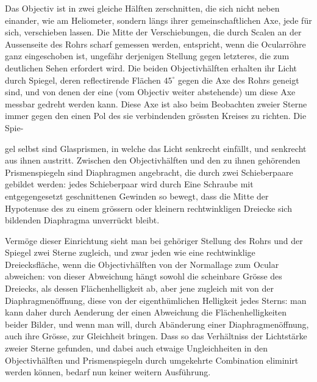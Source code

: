 Das Objectiv ist in zwei gleiche Hälften zerschnitten, die sich nicht neben einander, wie am Heliometer, sondern längs ihrer gemeinschaftlichen Axe, jede für sich, verschieben lassen. Die Mitte der Verschiebungen, die durch Scalen an der Aussenseite des Rohrs scharf gemessen werden, entspricht, wenn die Ocularröhre ganz eingeschoben ist, ungefähr derjenigen Stellung gegen letzteres, die zum deutlichen Sehen erfordert wird. Die beiden Objectivhälften erhalten ihr Licht durch Spiegel, deren reflectirende Flächen $45^\circ$ gegen die Axe des Rohrs geneigt sind, und von denen der eine (vom Objectiv weiter abstehende) um diese Axe messbar gedreht werden kann. Diese Axe ist also beim Beobachten zweier Sterne immer gegen den einen Pol des sie verbindenden grössten Kreises zu richten. Die Spie-\par
\clearpage
\thispagestyle{empty}
\noindent{}%
\makebox[12mm][l]{}%
%
\par\medskip
\noindent gel selbst sind Glasprismen, in welche das Licht senkrecht einfällt, und senkrecht aus ihnen
austritt. Zwischen den Objectivhälften und den zu ihnen gehörenden Prismenspiegeln sind
Diaphragmen angebracht, die durch zwei Schieberpaare gebildet werden: jedes Schieberpaar wird
durch Eine Schraube mit entgegengesetzt geschnittenen Gewinden so bewegt, dass die Mitte der
Hypotenuse des zu einem grössern oder kleinern rechtwinkligen Dreiecke sich bildenden Diaphragma
unverrückt bleibt.

Vermöge dieser Einrichtung sieht man bei gehöriger Stellung des Rohrs und der Spiegel zwei Sterne
zugleich, und zwar jeden wie eine rechtwinklige Dreiecksfläche, wenn die Objectivhälften von der
Normallage zum Ocular abweichen: von dieser Abweichung hängt sowohl die scheinbare Grösse des
Dreiecks, als dessen Flächenhelligkeit ab, aber jene zugleich mit von der Diaphragmenöffnung, diese
von der eigenthümlichen Helligkeit jedes Sterns: man kann daher durch Aenderung der einen
Abweichung die Flächenhelligkeiten beider Bilder, und wenn man will, durch Abänderung einer
Diaphragmenöffnung, auch ihre Grösse, zur Gleichheit bringen. Dass so das Verhältniss der
Lichtstärke zweier Sterne gefunden, und dabei auch etwaige Ungleichheiten in den Objectivhälften
und Prismenspiegeln durch umgekehrte Combination eliminirt werden können, bedarf nun keiner
weitern Ausführung.

